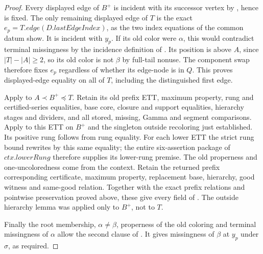 \begin{proof}
Every displayed edge of $B^+$ is incident with its successor vertex by
, hence is fixed. The only remaining displayed
edge of $T$ is the exact $e_p=T.\mathit{edge}(D.\mathit{lastEdgeIndex})$,
as the two index equations of the common datum show. It is incident with
$y_p$. If its old color were $\alpha$, this would contradict terminal
missingness by the incidence definition of .
Its position is above $A$, since $|T|-|A|\ge2$, so its old color is not
$\beta$ by full-tail nonuse. The component swap therefore fixes $e_p$
regardless of whether its edge-node is in $Q$. This proves displayed-edge
equality on all of $T$, including the distinguished first edge.

Apply  to
$A\prec B^+\preccurlyeq T$. Retain its old prefix ETT, maximum property,
rung and certified-series equalities, base core, closure and support
equalities, hierarchy stages and dividers, and all stored, missing,
Gamma and segment comparisons. Apply  to
this ETT on $B^+$ and the singleton outside recoloring just established.
Its positive rung follows from rung equality. For each lower ETT the
strict rung bound rewrites by this same equality; the entire six-assertion
package of $\mathit{ctx.lowerRung}$ therefore supplies its lower-rung
premise. The old properness and one-uncoloredness come from the context.
Retain the returned prefix corresponding certificate, maximum property,
replacement base, hierarchy, good witness and same-good relation. Together
with the exact prefix relations and pointwise preservation proved above,
these give every field of . The outside
hierarchy lemma was applied only to $B^+$, not to $T$.

Finally the root membership, $\alpha\ne\beta$, properness of the old
coloring and terminal missingness of $\alpha$ allow the second clause of
. It gives missingness of
$\beta$ at $y_p$ under $\sigma$, as required.
\end{proof}

